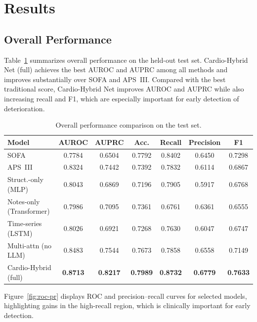 \documentclass{article}
\begin{document}
\section{Results}

\subsection{Overall Performance}

Table~\ref{tab:overall-performance} summarizes overall performance on the held-out test set.
Cardio-Hybrid Net (full) achieves the best AUROC and AUPRC among all methods and improves substantially over SOFA and APS~III.
Compared with the best traditional score, Cardio-Hybrid Net improves AUROC and AUPRC while also increasing recall and F1, which are especially important for early detection of deterioration.

\begin{table}[t]
  \centering
  \small
  \caption{Overall performance comparison on the test set.}
  \label{tab:overall-performance}

  \begin{tabular}{lcccccc}  %
    \toprule
    \textbf{Model} & \textbf{AUROC} & \textbf{AUPRC} & \textbf{Acc.} & \textbf{Recall} & \textbf{Precision} & \textbf{F1} \\
    \midrule
    SOFA                    & 0.7784 & 0.6504 & 0.7792 & 0.8402 & 0.6450 & 0.7298 \\
    APS~III                 & 0.8324 & 0.7442 & 0.7392 & 0.7832 & 0.6114 & 0.6867 \\
    Struct.-only (MLP)      & 0.8043 & 0.6869 & 0.7196 & 0.7905 & 0.5917 & 0.6768 \\
    Notes-only (Transformer)& 0.7986 & 0.7095 & 0.7361 & 0.6761 & 0.6361 & 0.6555 \\
    Time-series (LSTM)      & 0.8026 & 0.6921 & 0.7268 & 0.7630 & 0.6047 & 0.6747 \\
    Multi-attn (no LLM)     & 0.8483 & 0.7544 & 0.7673 & 0.7858 & 0.6558 & 0.7149 \\
    Cardio-Hybrid (full)    & \textbf{0.8713} & \textbf{0.8217} & \textbf{0.7989} & \textbf{0.8732} & \textbf{0.6779} & \textbf{0.7633} \\
    \bottomrule
  \end{tabular}
\end{table}

Figure~\ref{fig:roc-pr} displays ROC and precision--recall curves for selected models, highlighting gains in the high-recall region, which is clinically important for early detection.
\end{document}
